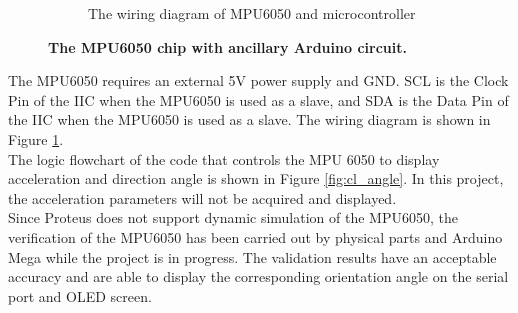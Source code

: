 \begin{figure}[H]
\begin{subfigure}{0.45\textwidth}
        \caption{\centering The wiring diagram of MPU6050 and microcontroller}
        \label{fig:mpu6050_circuit}
    \end{subfigure}
    \caption[The MPU6050 chip with ancillary Arduino circuit]
    {\centering \textbf{The MPU6050 chip with ancillary Arduino circuit.}}
    \label{fig:mpu6050}
\end{figure}
\noindent The MPU6050 requires an external 5V power supply and GND. SCL is the Clock Pin of the IIC when the 
MPU6050 is used as a slave, and SDA is the Data Pin of the IIC when the MPU6050 is used as a slave. The wiring 
diagram is shown in Figure \ref{fig:mpu6050_circuit}. \\
The logic flowchart of the code that controls the MPU 6050 to display acceleration and direction angle is shown 
in Figure \ref{fig:cl_angle}. In this project, the acceleration parameters will not be acquired and displayed. \\
Since Proteus does not support dynamic simulation of the MPU6050, the verification of the MPU6050 has been 
carried out by physical parts and Arduino Mega while the project is in progress. The validation results have 
an acceptable accuracy and are able to display the corresponding orientation angle on the serial port and 
OLED screen. \\
